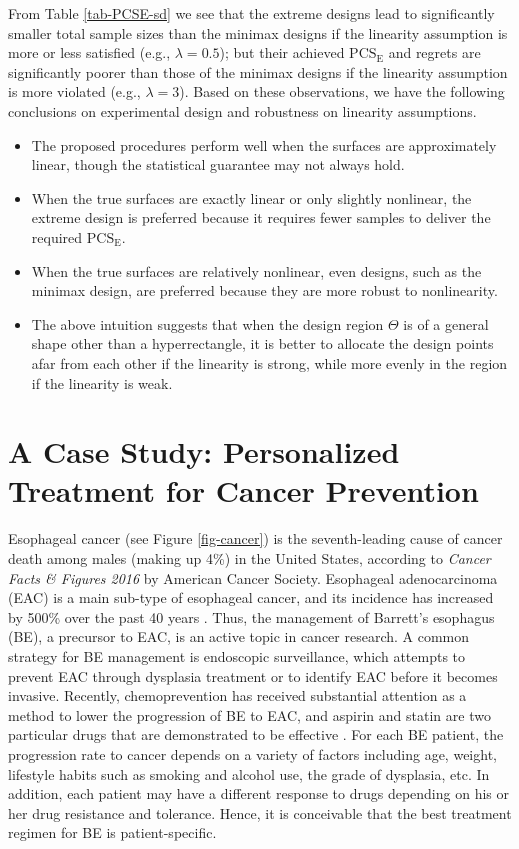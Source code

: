 \documentclass[ijoc,nonblindrev]{informs3}
\def\PCSE{\mathrm{PCS}_{\mathrm{E}}}
\begin{document}
From Table \ref{tab-PCSE-sd} we see that the extreme designs lead to significantly smaller total sample sizes than the minimax designs if the  linearity assumption is more or less satisfied (e.g., $\lambda=0.5$);
but their achieved $\PCSE$ and regrets are significantly poorer than those of the minimax designs if the  linearity assumption is more violated (e.g., $\lambda=3$).
Based on these observations, we have the following conclusions on experimental design and robustness on linearity assumptions.
\begin{itemize}
\item
The proposed procedures perform well when the surfaces are approximately linear, though the statistical guarantee may not always hold.
\item
When the true surfaces are exactly linear or only slightly nonlinear, the extreme design is preferred because it requires fewer samples to deliver the required $\PCSE$.
\item
When the true surfaces are relatively nonlinear, even designs, such as the minimax design, are preferred because they are more robust to nonlinearity.
\item
The above intuition suggests that when the design region $\Theta$ is of a general shape other than a hyperrectangle, it is better to allocate the design points afar from each other if the linearity is strong, while more evenly in the region if the linearity is weak.
\end{itemize}


\section{A Case Study: Personalized Treatment for Cancer Prevention} \label{sec-case}




Esophageal cancer (see Figure \ref{fig-cancer}) is the seventh-leading cause of cancer death among males (making up 4\%) in the United States, according to \textit{Cancer Facts \& Figures 2016} by American Cancer Society. Esophageal adenocarcinoma (EAC) is a main sub-type of esophageal cancer, and its incidence has increased by 500\% over the past 40 years \citep{hur2013,choi2014}.
Thus, the management of Barrett's esophagus (BE), a precursor to EAC, is an active topic in cancer research.
A common strategy for BE management is endoscopic surveillance, which attempts to prevent EAC through dysplasia treatment or to identify EAC before it becomes invasive.
Recently, chemoprevention has received substantial attention as a method to lower the progression of BE to EAC, and aspirin and statin are two particular drugs that are demonstrated to be effective \citep{kastelein2011}.
For each BE patient, the progression rate to cancer depends on a variety of factors including age, weight, lifestyle habits such as smoking and alcohol use, the grade of dysplasia, etc.
In addition, each patient may have a different response to drugs depending on his or her drug resistance and tolerance.
Hence, it is conceivable that the best treatment regimen for BE is patient-specific.
\end{document}
